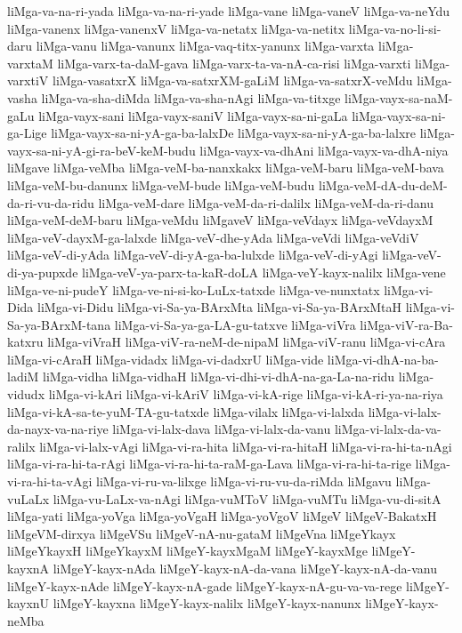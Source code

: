 {liMga-va-na-ri-yada
liMga-va-na-ri-yade
liMga-vane
liMga-vaneV
liMga-va-neYdu
liMga-vanenx
liMga-vanenxV
liMga-va-netatx
liMga-va-netitx
liMga-va-no-li-si-daru
liMga-vanu
liMga-vanunx
liMga-vaq-titx-yanunx
liMga-varxta
liMga-varxtaM
liMga-varx-ta-daM-gava
liMga-varx-ta-va-nA-ca-risi
liMga-varxti
liMga-varxtiV
liMga-vasatxrX
liMga-va-satxrXM-gaLiM
liMga-va-satxrX-veMdu
liMga-vasha
liMga-va-sha-diMda
liMga-va-sha-nAgi
liMga-va-titxge
liMga-vayx-sa-naM-gaLu
liMga-vayx-sani
liMga-vayx-saniV
liMga-vayx-sa-ni-gaLa
liMga-vayx-sa-ni-ga-Lige
liMga-vayx-sa-ni-yA-ga-ba-lalxDe
liMga-vayx-sa-ni-yA-ga-ba-lalxre
liMga-vayx-sa-ni-yA-gi-ra-beV-keM-budu
liMga-vayx-va-dhAni
liMga-vayx-va-dhA-niya
liMgave
liMga-veMba
liMga-veM-ba-nanxkakx
liMga-veM-baru
liMga-veM-bava
liMga-veM-bu-danunx
liMga-veM-bude
liMga-veM-budu
liMga-veM-dA-du-deM-da-ri-vu-da-ridu
liMga-veM-dare
liMga-veM-da-ri-dalilx
liMga-veM-da-ri-danu
liMga-veM-deM-baru
liMga-veMdu
liMgaveV
liMga-veVdayx
liMga-veVdayxM
liMga-veV-dayxM-ga-lalxde
liMga-veV-dhe-yAda
liMga-veVdi
liMga-veVdiV
liMga-veV-di-yAda
liMga-veV-di-yA-ga-ba-lulxde
liMga-veV-di-yAgi
liMga-veV-di-ya-pupxde
liMga-veV-ya-parx-ta-kaR-doLA
liMga-veY-kayx-nalilx
liMga-vene
liMga-ve-ni-pudeY
liMga-ve-ni-si-ko-LuLx-tatxde
liMga-ve-nunxtatx
liMga-vi-Dida
liMga-vi-Didu
liMga-vi-Sa-ya-BArxMta
liMga-vi-Sa-ya-BArxMtaH
liMga-vi-Sa-ya-BArxM-tana
liMga-vi-Sa-ya-ga-LA-gu-tatxve
liMga-viVra
liMga-viV-ra-Ba-katxru
liMga-viVraH
liMga-viV-ra-neM-de-nipaM
liMga-viV-ranu
liMga-vi-cAra
liMga-vi-cAraH
liMga-vidadx
liMga-vi-dadxrU
liMga-vide
liMga-vi-dhA-na-ba-ladiM
liMga-vidha
liMga-vidhaH
liMga-vi-dhi-vi-dhA-na-ga-La-na-ridu
liMga-vidudx
liMga-vi-kAri
liMga-vi-kAriV
liMga-vi-kA-rige
liMga-vi-kA-ri-ya-na-riya
liMga-vi-kA-sa-te-yuM-TA-gu-tatxde
liMga-vilalx
liMga-vi-lalxda
liMga-vi-lalx-da-nayx-va-na-riye
liMga-vi-lalx-dava
liMga-vi-lalx-da-vanu
liMga-vi-lalx-da-va-ralilx
liMga-vi-lalx-vAgi
liMga-vi-ra-hita
liMga-vi-ra-hitaH
liMga-vi-ra-hi-ta-nAgi
liMga-vi-ra-hi-ta-rAgi
liMga-vi-ra-hi-ta-raM-ga-Lava
liMga-vi-ra-hi-ta-rige
liMga-vi-ra-hi-ta-vAgi
liMga-vi-ru-va-lilxge
liMga-vi-ru-vu-da-riMda
liMgavu
liMga-vuLaLx
liMga-vu-LaLx-va-nAgi
liMga-vuMToV
liMga-vuMTu
liMga-vu-di-sitA
liMga-yati
liMga-yoVga
liMga-yoVgaH
liMga-yoVgoV
liMgeV
liMgeV-BakatxH
liMgeVM-dirxya
liMgeVSu
liMgeV-nA-nu-gataM
liMgeVna
liMgeYkayx
liMgeYkayxH
liMgeYkayxM
liMgeY-kayxMgaM
liMgeY-kayxMge
liMgeY-kayxnA
liMgeY-kayx-nAda
liMgeY-kayx-nA-da-vana
liMgeY-kayx-nA-da-vanu
liMgeY-kayx-nAde
liMgeY-kayx-nA-gade
liMgeY-kayx-nA-gu-va-va-rege
liMgeY-kayxnU
liMgeY-kayxna
liMgeY-kayx-nalilx
liMgeY-kayx-nanunx
liMgeY-kayx-neMba
}
